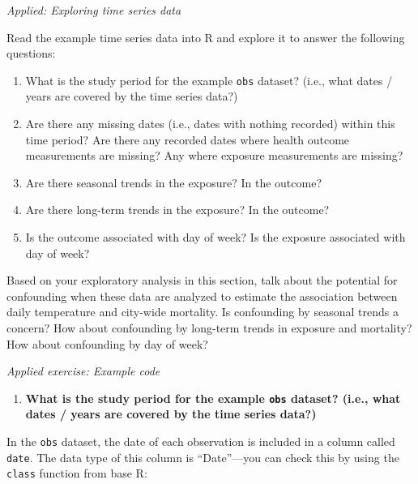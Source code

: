 \documentclass[
]{book}
\newenvironment{Shaded}{\begin{snugshade}}{\end{snugshade}}
\newcommand{\FunctionTok}[1]{\textcolor[rgb]{0.00,0.00,0.00}{#1}}
\newcommand{\NormalTok}[1]{#1}
\newcommand{\SpecialCharTok}[1]{\textcolor[rgb]{0.00,0.00,0.00}{#1}}
\providecommand{\tightlist}{%
  \setlength{\itemsep}{0pt}\setlength{\parskip}{0pt}}
\begin{document}
\emph{Applied: Exploring time series data}

Read the example time series data into R and explore it to answer the following
questions:

\begin{enumerate}
\def\labelenumi{\arabic{enumi}.}
\tightlist
\item
  What is the study period for the example \texttt{obs} dataset? (i.e., what
  dates / years are covered by the time series data?)
\item
  Are there any missing dates (i.e., dates with nothing recorded) within this time
  period? Are there any recorded dates where health outcome measurements are missing?
  Any where exposure measurements are missing?
\item
  Are there seasonal trends in the exposure? In the outcome?
\item
  Are there long-term trends in the exposure? In the outcome?
\item
  Is the outcome associated with day of week? Is the exposure associated
  with day of week?
\end{enumerate}

Based on your exploratory analysis in this section, talk about the potential
for confounding when these data are analyzed to estimate the association between
daily temperature and city-wide mortality. Is confounding by seasonal trends
a concern? How about confounding by long-term trends in exposure and mortality?
How about confounding by day of week?

\emph{Applied exercise: Example code}

\begin{enumerate}
\def\labelenumi{\arabic{enumi}.}
\tightlist
\item
  \textbf{What is the study period for the example \texttt{obs} dataset? (i.e., what
  dates / years are covered by the time series data?)}
\end{enumerate}

In the \texttt{obs} dataset, the date of each observation is included in a column called
\texttt{date}. The data type of this column is ``Date''---you can check this by using
the \texttt{class} function from base R:

\begin{Shaded}
\end{Shaded}
\end{document}
